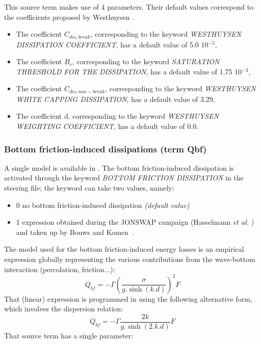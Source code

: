  This source term makes use of 4 parameters. Their default values correspond to the coefficients proposed by Westhuysen  \cite{Westhuys2008}.

\begin{itemize}
\item  The coefficient ${C}_{dis,break}$, corresponding to the keyword \textit{WESTHUYSEN  DISSIPATION COEFFICIENT}, has a default value of 5.0 10${}^{-5}$,
\item  The coefficient ${B}_{r}$, corresponding to the keyword \textit{SATURATION THRESHOLD FOR THE DISSIPATION}, has a default value of 1.75 10${}^{-3}$,
\item  The coefficient ${C}_{dis,non-break}$, corresponding to the keyword \textit{WESTHUYSEN WHITE CAP\-PING DISSIPATION}, has a default value of 3.29,
\item  The coefficient d, corresponding to the keyword \textit{WESTHUYSEN WEIGHTING COEFFICIENT}, has a default value of 0.0.
\end{itemize}


\subsubsection{ Bottom friction-induced dissipations (term Qbf)}

 A single model is available in \tomawac. The bottom friction-induced dissipation is activated through the keyword \textit{BOTTOM FRICTION DISSIPATION} in the steering file; the keyword can take two values, namely:

 \begin{itemize}
\item 0 no bottom friction-induced dissipation \textit{(default value)}

\item 1 expression obtained during the JONSWAP campaign (Hasselmann \textit{et al.} \cite{Hasselmann1973}) and taken up by Bouws and Komen~\cite{Bouws1983}.
\end{itemize}

 The model used for the bottom friction-induced energy losses is an empirical expression globally representing the various contributions from the wave-bottom interaction (percolation, friction...):
\begin{equation} \label{GrindEQ__4_42_}
Q_{bf} =-\Gamma \left(\frac{\sigma }{g.\sinh \left(k.d\right)} \right)^{2} F
\end{equation}
That (linear) expression is programmed in \tomawac using the following alternative form, which involves the dispersion relation:
\begin{equation} \label{GrindEQ__4_43_}
Q_{bf} =-\Gamma \frac{2k}{g.\sinh \left(2.k.d\right)} F
\end{equation}
That source term has a single parameter:

